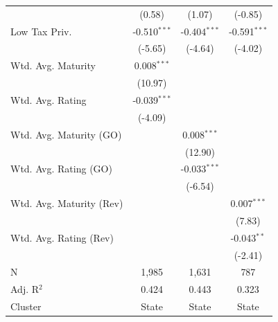 \begin{tabular*}{\textwidth}{@{\extracolsep{\fill}}lccc}
                              & (0.58)                     & (1.07)             & (-0.85)\\   
   Low Tax Priv.              & -0.510$^{***}$              & -0.404$^{***}$      & -0.591$^{***}$\\   
                              & (-5.65)                    & (-4.64)            & (-4.02)\\   
   Wtd. Avg. Maturity         & 0.008$^{***}$               &                     &   \\   
                              & (10.97)                    &                     &   \\   
   Wtd. Avg. Rating           & -0.039$^{***}$              &                     &   \\   
                              & (-4.09)                    &                     &   \\   
   Wtd. Avg. Maturity (GO)    &                             & 0.008$^{***}$       &   \\   
                              &                             & (12.90)            &   \\   
   Wtd. Avg. Rating (GO)      &                             & -0.033$^{***}$      &   \\   
                              &                             & (-6.54)            &   \\   
   Wtd. Avg. Maturity (Rev)   &                             &                     & 0.007$^{***}$\\   
                              &                             &                     & (7.83)\\   
   Wtd. Avg. Rating (Rev)     &                             &                     & -0.043$^{**}$\\   
                              &                             &                     & (-2.41)\\   
   \hline
   N               & 1,985                       & 1,631               & 787\\  
   Adj. R$^2$             & 0.424                       & 0.443               & 0.323\\  
   Cluster              & State & State & State\\  
   \bottomrule
\end{tabular*}
\par\endgroup
